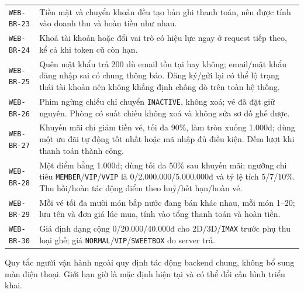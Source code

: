 \begin{longtable}{@{}P{0.23000\SRSWidth}P{0.77000\SRSWidth}@{}}
\texttt{WEB-\allowbreak{}BR-\allowbreak{}23} & Tiền mặt và chuyển khoản đều tạo bản ghi thanh toán, nên được tính vào doanh thu và hoàn tiền như nhau. \\[3pt]
\texttt{WEB-\allowbreak{}BR-\allowbreak{}24} & Khoá tài khoản hoặc đổi vai trò có hiệu lực ngay ở request tiếp theo, kể cả khi token cũ còn hạn. \\[3pt]
\texttt{WEB-\allowbreak{}BR-\allowbreak{}25} & Quên mật khẩu trả 200 dù email tồn tại hay không; email/\allowbreak{}mật khẩu đăng nhập sai có chung thông báo. Đăng ký/\allowbreak{}gửi lại có thể lộ trạng thái tài khoản nên không khẳng định chống dò trên toàn hệ thống. \\[3pt]
\texttt{WEB-\allowbreak{}BR-\allowbreak{}26} & Phim ngừng chiếu chỉ chuyển \texttt{INACTIVE\allowbreak{}}, không xoá; vé đã đặt giữ nguyên. Phòng có suất chiếu không xoá và không sửa sơ đồ ghế được. \\[3pt]
\texttt{WEB-\allowbreak{}BR-\allowbreak{}27} & Khuyến mãi chỉ giảm tiền vé, tối đa 90\%, làm tròn xuống 1.000đ; dùng một ưu đãi tự động tốt nhất hoặc mã nhập đủ điều kiện. Đếm lượt khi thanh toán thành công. \\[3pt]
\texttt{WEB-\allowbreak{}BR-\allowbreak{}28} & Một điểm bằng 1.000đ; dùng tối đa 50\% sau khuyến mãi; ngưỡng chi tiêu \texttt{MEMBER}/\allowbreak{}\texttt{VIP}/\allowbreak{}\texttt{VVIP} là 0/\allowbreak{}2.000.000/\allowbreak{}5.000.000đ và tỷ lệ tích 5/\allowbreak{}7/\allowbreak{}10\%. Thu hồi/\allowbreak{}hoàn tác động điểm theo huỷ/\allowbreak{}hết hạn/\allowbreak{}hoàn vé. \\[3pt]
\texttt{WEB-\allowbreak{}BR-\allowbreak{}29} & Mỗi vé tối đa mười món bắp nước đang bán khác nhau, mỗi món 1–20; lưu tên và đơn giá lúc mua, tính vào tổng thanh toán và hoàn tiền. \\[3pt]
\texttt{WEB-\allowbreak{}BR-\allowbreak{}30} & Giá định dạng cộng 0/\allowbreak{}20.000/\allowbreak{}40.000đ cho 2D/\allowbreak{}3D/\allowbreak{}\texttt{IMAX} trước phụ thu loại ghế; giá \texttt{NORMAL}/\allowbreak{}\texttt{VIP}/\allowbreak{}\texttt{SWEETBOX\allowbreak{}} do server trả. \\[3pt]
\end{longtable}
\endgroup

Quy tắc người vận hành ngoài quy định tác động backend chung, không bổ sung màn điện thoại. Giới hạn giờ là mặc định hiện tại và có thể đổi cấu hình triển khai.
